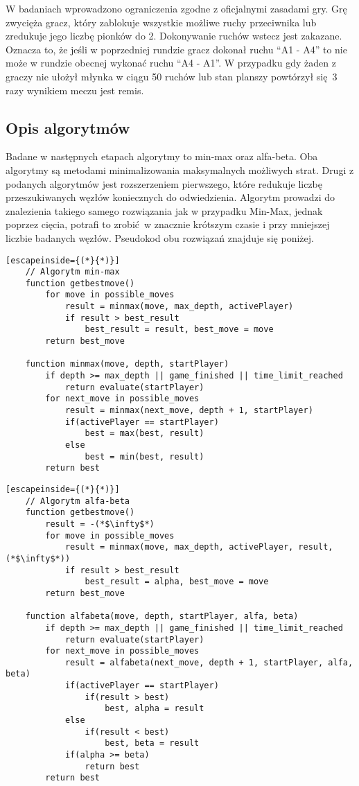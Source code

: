 \documentclass[a4paper,10pt]{article}
\begin{document}
    W badaniach wprowadzono ograniczenia zgodne z oficjalnymi zasadami gry. Grę zwycięża gracz, który zablokuje wszystkie możliwe ruchy przeciwnika lub zredukuje jego liczbę pionków do 2. Dokonywanie ruchów wstecz jest zakazane. Oznacza to, że jeśli w poprzedniej rundzie gracz dokonał ruchu ``A1 - A4'' to nie może w rundzie obecnej wykonać ruchu ``A4 - A1''. W przypadku gdy żaden z graczy nie ułożył młynka w ciągu 50 ruchów lub stan planszy powtórzył się 3 razy wynikiem meczu jest remis.
    
    \justify
    \subsection{Opis algorytmów}
    Badane w następnych etapach algorytmy to min-max oraz alfa-beta. Oba algorytmy są metodami minimalizowania maksymalnych możliwych strat. Drugi z podanych algorytmów jest rozszerzeniem pierwszego, które redukuje liczbę przeszukiwanych węzłów koniecznych do odwiedzienia. Algorytm prowadzi do znalezienia takiego samego rozwiązania jak w przypadku Min-Max, jednak poprzez cięcia, potrafi to zrobić w znacznie krótszym czasie i przy mniejszej liczbie badanych węzłów. Pseudokod obu rozwiązań znajduje się poniżej.
    
    \begin{lstlisting}[escapeinside={(*}{*)}]
    // Algorytm min-max
    function getbestmove()
        for move in possible_moves
            result = minmax(move, max_depth, activePlayer)
            if result > best_result
                best_result = result, best_move = move
        return best_move
        
    function minmax(move, depth, startPlayer)
        if depth >= max_depth || game_finished || time_limit_reached
            return evaluate(startPlayer)
        for next_move in possible_moves
            result = minmax(next_move, depth + 1, startPlayer)
            if(activePlayer == startPlayer)
                best = max(best, result)
            else
                best = min(best, result)
        return best
    \end{lstlisting}
    \newpage
    \begin{lstlisting}[escapeinside={(*}{*)}]
    // Algorytm alfa-beta
    function getbestmove()
        result = -(*$\infty$*)
        for move in possible_moves
            result = minmax(move, max_depth, activePlayer, result, (*$\infty$*))
            if result > best_result
                best_result = alpha, best_move = move
        return best_move
        
    function alfabeta(move, depth, startPlayer, alfa, beta)
        if depth >= max_depth || game_finished || time_limit_reached
            return evaluate(startPlayer)
        for next_move in possible_moves
            result = alfabeta(next_move, depth + 1, startPlayer, alfa, beta)
            if(activePlayer == startPlayer)
                if(result > best)
                    best, alpha = result
            else
                if(result < best)
                    best, beta = result
            if(alpha >= beta)
                return best
        return best
    \end{lstlisting}
    
\end{document}
